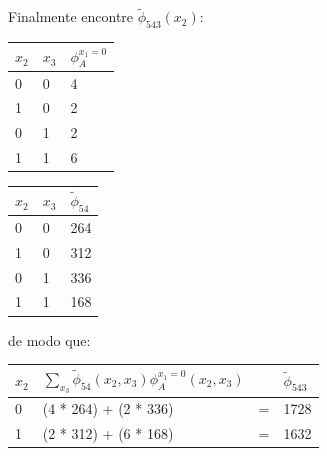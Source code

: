 \begin{exenumerate}
\begin{solution}
        Finalmente encontre $\tilde{\phi}_{543}(x_2)$:
        \begin{center}
            \begin{tabular}{lll}
                \toprule
                $x_2$ & $x_3$ & $\phi_A^{x_1=0}$\\
                \midrule
                0 & 0 & 4 \\
                1 & 0 & 2 \\
                0 & 1 & 2 \\
                1 & 1 & 6 \\
                \bottomrule
            \end{tabular}\hspace{2ex}
            \begin{tabular}{lll}
                \toprule
                $x_2$ & $x_3$ & $\tilde{\phi}_{54}$\\
                \midrule
                0 & 0 & 264 \\
                1 & 0 & 312 \\
                0 & 1 & 336 \\
                1 & 1 & 168 \\
                \bottomrule
            \end{tabular}
        \end{center}
        de modo que:
        \begin{center}
            \begin{tabular}{llll}
                \toprule
                $x_2$ & $\sum_{x_3} \tilde{\phi}_{54}(x_2, x_3) \phi_A^{x_1=0}(x_2,x_3)$ &  & $\tilde{\phi}_{543}$\\
                \midrule
                0 & (4 * 264) + (2 * 336) & = & 1728 \\
                1 & (2 * 312) + (6 * 168) & = & 1632 \\
                \bottomrule
            \end{tabular}
        \end{center}
        

\end{solution}
\end{exenumerate}

